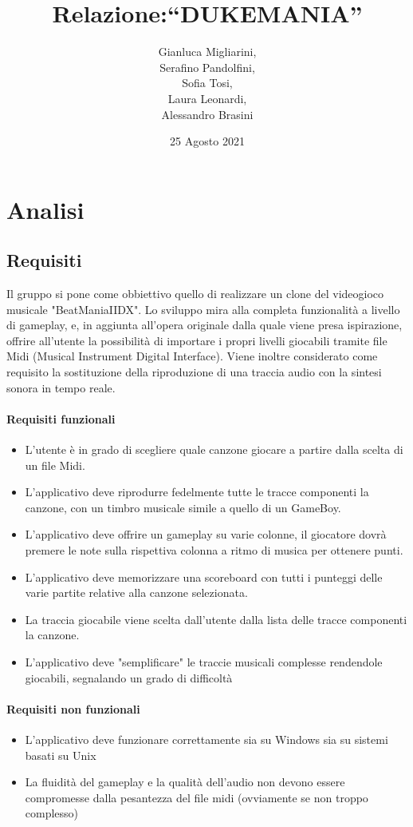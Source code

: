 \documentclass[a4paper,12pt]{report}
\title{Relazione:\break``DUKEMANIA''}
\author{Gianluca Migliarini, \\ Serafino Pandolfini,\\ Sofia Tosi,\\ Laura Leonardi, \\ Alessandro Brasini}
\date{25 Agosto 2021}
\begin{document}
\maketitle
\tableofcontents




\chapter{Analisi}
\section{Requisiti}
Il gruppo si pone come obbiettivo quello di realizzare un clone del videogioco musicale "BeatManiaIIDX".
Lo sviluppo mira alla completa funzionalità a livello di gameplay, e, in aggiunta all'opera originale
dalla quale viene presa ispirazione, offrire all'utente la possibilità di importare i propri livelli giocabili tramite file Midi (Musical Instrument Digital Interface). Viene inoltre considerato come requisito la sostituzione della riproduzione di una traccia audio con la sintesi sonora in tempo reale.
\begingroup
\fontsize{11pt}{10pt}\selectfont

\subsubsection{Requisiti funzionali}
\begin{itemize}
	\item L'utente è in grado di scegliere quale canzone giocare a partire dalla scelta di un file Midi.
	\item L'applicativo deve riprodurre fedelmente tutte le tracce componenti la canzone, con un timbro musicale
	simile a quello di un GameBoy.
	\item L'applicativo deve offrire un gameplay su varie colonne, il giocatore dovrà premere le note sulla rispettiva colonna a ritmo di musica per ottenere punti.
	\item L'applicativo deve memorizzare una scoreboard con tutti i punteggi delle varie partite relative alla canzone selezionata.
	\item La traccia giocabile viene scelta dall'utente dalla lista delle tracce componenti la canzone.
	\item L'applicativo deve "semplificare" le traccie musicali complesse rendendole giocabili, segnalando un grado di difficoltà
\end{itemize}

\subsubsection{Requisiti non funzionali}
\begin{itemize}
	\item L'applicativo deve funzionare correttamente sia su Windows sia su sistemi basati su Unix
	\item La fluidità del gameplay e la qualità dell'audio non devono essere compromesse dalla pesantezza del file midi (ovviamente se non troppo complesso)
\end{itemize}
\endgroup
\newpage
\end{document}
